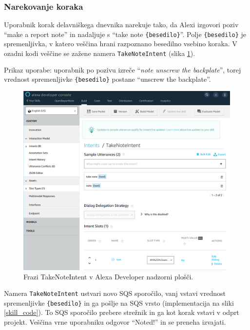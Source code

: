 \documentclass[a4paper, 12pt]{book}
\begin{document}
\subsubsection{Narekovanje koraka}

Uporabnik korak delavniškega dnevnika narekuje tako, da Alexi izgovori poziv \enquote{make a report note} in nadaljuje s \enquote{take note \texttt{\{besedilo\}}}.
Polje \texttt{\{besedilo\}} je spremenljivka, v katero veščina hrani razpoznano besedilno vsebino koraka.
V ozadni kodi veščine se zažene namera \texttt{TakeNoteIntent} (slika \ref{TakeNoteIntent}).

Prikaz uporabe: uporabnik po pozivu izreče \enquote{\textit{note unscrew the backplate}}, torej vrednost spremenljivke \texttt{\{besedilo\}} postane \enquote{unscrew the backplate}.



\begin{figure}[H]
\begin{center}
\includegraphics[width=13cm]{intent_literal}
\end{center}
\caption{Frazi TakeNoteIntent v Alexa Developer nadzorni plošči.}
\label{TakeNoteIntent}
\end{figure}

Namera \texttt{TakeNoteIntent} ustvari novo SQS sporočilo, vanj vstavi vrednost spremenljivke \texttt{\{besedilo\}} in ga pošlje na SQS vrsto (implementacija na sliki \ref{skill_code}).
To SQS sporočilo prebere strežnik in ga kot korak vstavi v odprt projekt.
Veščina vrne uporabniku odgovor \enquote{Noted!} in se preneha izvajati.
\end{document}
